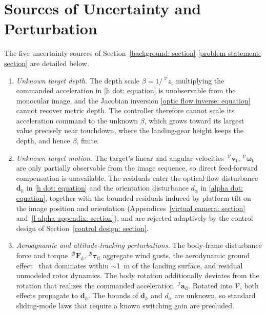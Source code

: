 \documentclass{IEEEtaes}
\begin{document}
\section{Sources of Uncertainty and Perturbation} \label{uncertainty appendix: section}
The five uncertainty sources of Section~\ref{background: section}-\ref{problem statement: section} are detailed below.
\begin{enumerate}
    \item \emph{Unknown target depth.} The depth scale $\beta=1/\,^\mathcal{V}z_\text{t}$ multiplying the commanded acceleration in \eqref{h dot: equation} is unobservable from the monocular image, and the Jacobian inversion \eqref{optic flow inverse: equation} cannot recover metric depth. The controller therefore cannot scale its acceleration command to the unknown $\beta$, which grows toward its largest value precisely near touchdown, where the landing-gear height keeps the depth, and hence $\beta$, finite.
    \item \emph{Unknown target motion.} The target's linear and angular velocities $\,^\mathcal{V}\boldsymbol{v}_\text{t},\,^\mathcal{V}\boldsymbol{\omega}_\text{t}$ are only partially observable from the image sequence, so direct feed-forward compensation is unavailable. The residuals enter the optical-flow disturbance $\boldsymbol{d}_h$ in \eqref{h dot: equation} and the orientation disturbance $d_\alpha$ in \eqref{alpha dot: equation}, together with the bounded residuals induced by platform tilt on the image position and orientation (Appendices~\ref{virtual camera: section} and~\ref{l alpha appendix: section}), and are rejected adaptively by the control design of Section~\ref{control design: section}.
    \item \emph{Aerodynamic and attitude-tracking perturbations.} The body-frame disturbance force and torque $\,^\mathcal{B}\boldsymbol{F}_\text{d},\,^\mathcal{B}\boldsymbol{\tau}_\text{d}$ aggregate wind gusts, the aerodynamic ground effect~\cite{sanchez-cuevas2017} that dominates within $\sim$1~m of the landing surface, and residual unmodeled rotor dynamics. The body rotation additionally deviates from the rotation that realizes the commanded acceleration $\,^\mathcal{I}\boldsymbol{a}_\text{d}$. Rotated into $\mathcal{V}$, both effects propagate to $\boldsymbol{d}_h$. The bounds of $\boldsymbol{d}_h$ and $d_\alpha$ are unknown, so standard sliding-mode laws that require a known switching gain are precluded.

\end{enumerate}
\end{document}
